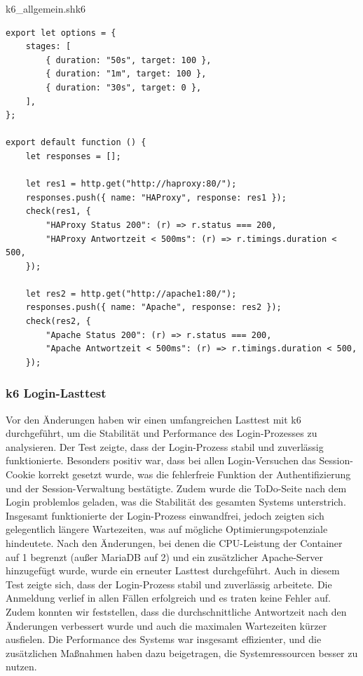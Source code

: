 \begin{code}{k6\_allgemein.sh}{k6}
        \begin{verbatim}
export let options = {
    stages: [
        { duration: "50s", target: 100 },
        { duration: "1m", target: 100 },
        { duration: "30s", target: 0 },
    ],
};

export default function () {
    let responses = [];

    let res1 = http.get("http://haproxy:80/");
    responses.push({ name: "HAProxy", response: res1 });
    check(res1, {
        "HAProxy Status 200": (r) => r.status === 200,
        "HAProxy Antwortzeit < 500ms": (r) => r.timings.duration < 500,
    });

    let res2 = http.get("http://apache1:80/");
    responses.push({ name: "Apache", response: res2 });
    check(res2, {
        "Apache Status 200": (r) => r.status === 200,
        "Apache Antwortzeit < 500ms": (r) => r.timings.duration < 500,
    });
        \end{verbatim}
\end{code}

\subsubsection{k6 Login-Lasttest}
Vor den Änderungen haben wir einen umfangreichen Lasttest mit k6 durchgeführt, um die Stabilität und Performance des Login-Prozesses zu analysieren. Der Test zeigte, dass der Login-Prozess stabil und zuverlässig funktionierte. Besonders positiv war, dass bei allen Login-Versuchen das Session-Cookie korrekt gesetzt wurde, was die fehlerfreie Funktion der Authentifizierung und der Session-Verwaltung bestätigte. Zudem wurde die ToDo-Seite nach dem Login problemlos geladen, was die Stabilität des gesamten Systems unterstrich. Insgesamt funktionierte der Login-Prozess einwandfrei, jedoch zeigten sich gelegentlich längere Wartezeiten, was auf mögliche Optimierungspotenziale hindeutete.
Nach den Änderungen, bei denen die CPU-Leistung der Container auf 1 begrenzt (außer MariaDB auf 2) und ein zusätzlicher Apache-Server hinzugefügt wurde, wurde ein erneuter Lasttest durchgeführt. Auch in diesem Test zeigte sich, dass der Login-Prozess stabil und zuverlässig arbeitete. Die Anmeldung verlief in allen Fällen erfolgreich und es traten keine Fehler auf. Zudem konnten wir feststellen, dass die durchschnittliche Antwortzeit nach den Änderungen verbessert wurde und auch die maximalen Wartezeiten kürzer ausfielen. Die Performance des Systems war insgesamt effizienter, und die zusätzlichen Maßnahmen haben dazu beigetragen, die Systemressourcen besser zu nutzen.

